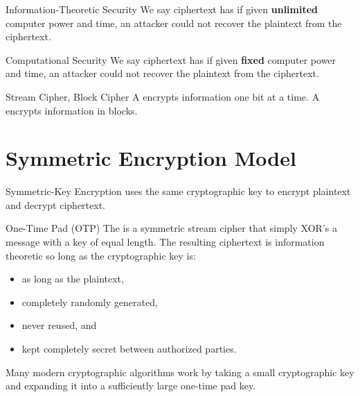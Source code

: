 \documentclass[code]{amznotes}
\begin{document}
\begin{dfnbox}{Information-Theoretic Security}{}
    We say ciphertext has  if given \textbf{unlimited} computer power and time, an attacker could not recover the plaintext from the ciphertext.
\end{dfnbox}

\begin{dfnbox}{Computational Security}{}
    We say ciphertext has  if given \textbf{fixed} computer power and time, an attacker could not recover the plaintext from the ciphertext.
\end{dfnbox}

\begin{dfnbox}{Stream Cipher, Block Cipher}{}
    A  encrypts information one bit at a time.     A  encrypts information in blocks.
\end{dfnbox}

\section{Symmetric Encryption Model}

\begin{dfnbox}{Symmetric-Key Encryption}{}
     uses the same cryptographic key to encrypt plaintext and decrypt ciphertext.
\end{dfnbox}

\begin{dfnbox}{One-Time Pad (OTP)}{}
    The  is a symmetric stream cipher that simply XOR's a message with a key of equal length. The resulting ciphertext is information theoretic so long as the cryptographic key is:
    \begin{itemize}[noitemsep]
        \item as long as the plaintext,
        \item completely randomly generated,
        \item never reused, and
        \item kept completely secret between authorized parties.
   \end{itemize}
\end{dfnbox}

Many modern cryptographic algorithms work by taking a small cryptographic key and expanding it into a sufficiently large one-time pad key.
\end{document}
